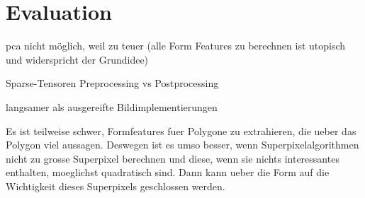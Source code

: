 \chapter{Evaluation}
\label{evaluation}



pca nicht möglich, weil zu teuer (alle Form Features zu berechnen ist utopisch und widerspricht der Grundidee)



Sparse-Tensoren
Preprocessing vs Postprocessing




langsamer als ausgereifte Bildimplementierungen



Es ist teilweise schwer, Formfeatures fuer Polygone zu extrahieren, die ueber das Polygon viel aussagen. Deswegen ist es umso besser, wenn Superpixelalgorithmen nicht zu grosse Superpixel berechnen und diese, wenn sie nichts interessantes enthalten, moeglichst quadratisch sind. Dann kann ueber die Form auf die Wichtigkeit dieses Superpixels geschlossen werden.
